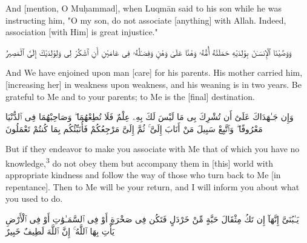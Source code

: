 \begin{translation}
	And [mention, O Muḥammad], when Luqmān said to his son while he was instructing him, "O my son, do not associate [anything] with Allah. Indeed, association [with Him] is great injustice."
\end{translation}


\begin{edition*}
	\begin{Arabic}
		وَوَصَّيْنَا ٱلْإِنسَـٰنَ بِوَٰلِدَيْهِ حَمَلَتْهُ أُمُّهُۥ وَهْنًا عَلَىٰ وَهْنٍ وَفِصَـٰلُهُۥ فِى عَامَيْنِ أَنِ ٱشْكُرْ لِى وَلِوَٰلِدَيْكَ إِلَىَّ ٱلْمَصِيرُ
	\end{Arabic}
\end{edition*}

\begin{translation}
	And We have enjoined upon man [care] for his parents. His mother carried him, [increasing her] in weakness upon weakness, and his weaning is in two years. Be grateful to Me and to your parents; to Me is the [final] destination.
\end{translation}


\begin{edition*}
	\begin{Arabic}
		وَإِن جَـٰهَدَاكَ عَلَىٰٓ أَن تُشْرِكَ بِى مَا لَيْسَ لَكَ بِهِۦ عِلْمٌ فَلَا تُطِعْهُمَا ۖ وَصَاحِبْهُمَا فِى ٱلدُّنْيَا مَعْرُوفًا ۖ وَٱتَّبِعْ سَبِيلَ مَنْ أَنَابَ إِلَىَّ ۚ ثُمَّ إِلَىَّ مَرْجِعُكُمْ فَأُنَبِّئُكُم بِمَا كُنتُمْ تَعْمَلُونَ
	\end{Arabic}
\end{edition*}

\begin{translation}
	But if they endeavor to make you associate with Me that of which you have no knowledge,\textsuperscript{3} do not obey them but accompany them in [this] world with appropriate kindness and follow the way of those who turn back to Me [in repentance]. Then to Me will be your return, and I will inform you about what you used to do.
\end{translation}


\begin{edition*}
	\begin{Arabic}
		يَـٰبُنَىَّ إِنَّهَآ إِن تَكُ مِثْقَالَ حَبَّةٍ مِّنْ خَرْدَلٍ فَتَكُن فِى صَخْرَةٍ أَوْ فِى ٱلسَّمَـٰوَٰتِ أَوْ فِى ٱلْأَرْضِ يَأْتِ بِهَا ٱللَّهُ ۚ إِنَّ ٱللَّهَ لَطِيفٌ خَبِيرٌ
	\end{Arabic}
\end{edition*}

